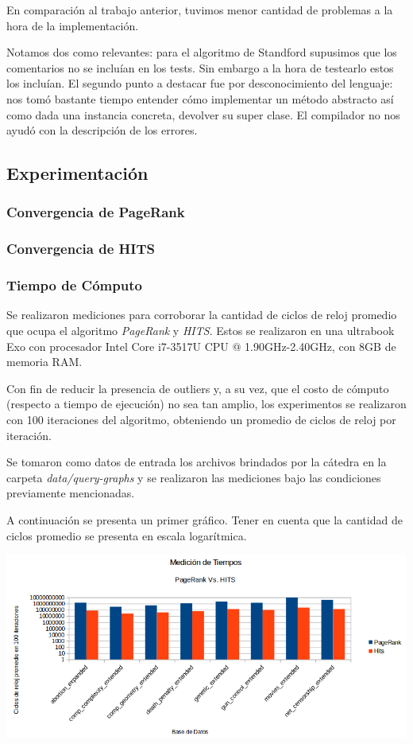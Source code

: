 	En comparación al trabajo anterior, tuvimos menor cantidad de problemas a la hora de la implementación. 

	Notamos dos como relevantes: para el algoritmo de Standford supusimos que los comentarios no se incluían en los tests. Sin embargo a la hora de testearlo estos los incluían. El segundo punto a destacar fue por desconocimiento del lenguaje: nos tomó bastante tiempo entender cómo implementar un método abstracto así como dada una instancia concreta, devolver su super clase. El compilador no nos ayudó con la descripción de los errores.

\subsection{Experimentación}
\subsubsection{Convergencia de PageRank}

\subsubsection{Convergencia de HITS}

\subsubsection{Tiempo de Cómputo}	
Se realizaron mediciones para corroborar la cantidad de ciclos de reloj promedio que ocupa el algoritmo \textit{PageRank} y \textit{HITS}. Estos se realizaron en una ultrabook Exo con procesador Intel Core i7-3517U CPU @ 1.90GHz-2.40GHz, con 8GB de memoria RAM.  
\par 
Con fin de reducir la presencia de outliers y, a su vez, que el costo de cómputo (respecto a tiempo de ejecución) no sea tan amplio, los experimentos se realizaron con 100 iteraciones del algoritmo, obteniendo un promedio de ciclos de reloj por iteración.
\par 
Se tomaron como datos de entrada los archivos brindados por la cátedra en la carpeta \textit{data/query-graphs} y se realizaron las mediciones bajo las condiciones previamente mencionadas.
\par 
A continuación se presenta un primer gráfico. Tener en cuenta que la cantidad de ciclos promedio se presenta en escala logarítmica. 

	\par 
	\begin{center}
		\includegraphics[scale=0.5]{./img/medicionesTiempo1.png}
	\end{center}
	
